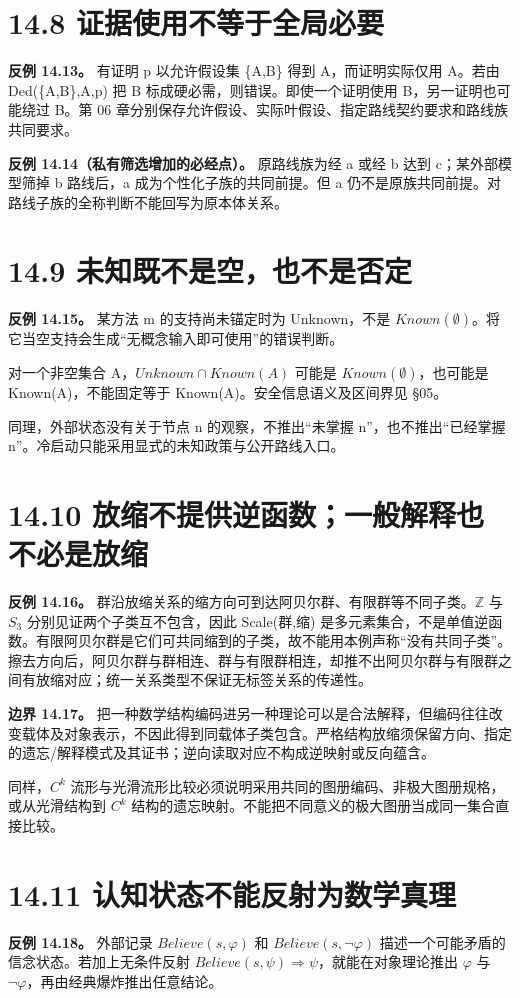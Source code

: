 \documentclass[UTF8,a4paper,zihao=-4,fontset=windows,openany]{ctexbook}
\def\mathrm#1{#1}%
\begin{document}
\section{14.8 证据使用不等于全局必要}
\textbf{反例 14.13。} 有证明 p 以允许假设集 \{A,B\} 得到 A，而证明实际仅用 A。若由 Ded(\{A,B\},A,p) 把 B 标成硬必需，则错误。即使一个证明使用 B，另一证明也可能绕过 B。第 06 章分别保存允许假设、实际叶假设、指定路线契约要求和路线族共同要求。

\textbf{反例 14.14（私有筛选增加的必经点）。} 原路线族为经 a 或经 b 达到 c；某外部模型筛掉 b 路线后，a 成为个性化子族的共同前提。但 a 仍不是原族共同前提。对路线子族的全称判断不能回写为原本体关系。

\section{14.9 未知既不是空，也不是否定}
\textbf{反例 14.15。} 某方法 m 的支持尚未锚定时为 Unknown，不是 \(\mathrm{Known}(\emptyset)\)。将它当空支持会生成“无概念输入即可使用”的错误判断。

对一个非空集合 A，\(\mathrm{Unknown}\cap\mathrm{Known}(A)\) 可能是 \(\mathrm{Known}(\emptyset)\)，也可能是 Known(A)，不能固定等于 Known(A)。安全信息语义及区间界见 §05。

同理，外部状态没有关于节点 n 的观察，不推出“未掌握 n”，也不推出“已经掌握 n”。冷启动只能采用显式的未知政策与公开路线入口。

\section{14.10 放缩不提供逆函数；一般解释也不必是放缩}
\textbf{反例 14.16。} 群沿放缩关系的缩方向可到达阿贝尔群、有限群等不同子类。\(\mathbb{Z}\) 与 \(S_{3}\) 分别见证两个子类互不包含，因此 Scale(群,缩) 是多元素集合，不是单值逆函数。有限阿贝尔群是它们可共同缩到的子类，故不能用本例声称“没有共同子类”。擦去方向后，阿贝尔群与群相连、群与有限群相连，却推不出阿贝尔群与有限群之间有放缩对应；统一关系类型不保证无标签关系的传递性。

\textbf{边界 14.17。} 把一种数学结构编码进另一种理论可以是合法解释，但编码往往改变载体及对象表示，不因此得到同载体子类包含。严格结构放缩须保留方向、指定的遗忘/解释模式及其证书；逆向读取对应不构成逆映射或反向蕴含。

同样，\(C^k\) 流形与光滑流形比较必须说明采用共同的图册编码、非极大图册规格，或从光滑结构到 \(C^k\) 结构的遗忘映射。不能把不同意义的极大图册当成同一集合直接比较。

\section{14.11 认知状态不能反射为数学真理}
\textbf{反例 14.18。} 外部记录 \(\mathrm{Believe}(s,\varphi)\) 和 \(\mathrm{Believe}(s,\neg\varphi)\) 描述一个可能矛盾的信念状态。若加上无条件反射 \(\mathrm{Believe}(s,\psi)\Rightarrow\psi\)，就能在对象理论推出 \(\varphi\) 与 \(\neg\varphi\)，再由经典爆炸推出任意结论。
\end{document}
